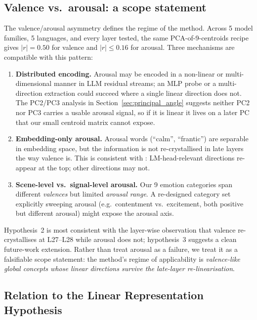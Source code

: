\subsection{Valence vs.\ arousal: a scope statement}

The valence/arousal asymmetry defines the regime of the method. Across 5
model families, 5 languages, and every layer tested, the same PCA-of-9-centroids
recipe gives $|r|=0.50$ for valence and $|r|\leq 0.16$ for arousal. Three
mechanisms are compatible with this pattern:

\begin{enumerate}[leftmargin=*]
\item \textbf{Distributed encoding.} Arousal may be encoded in a
non-linear or multi-dimensional manner in LLM residual streams; an
MLP probe or a multi-direction extraction could succeed where a single
linear direction does not. The PC2/PC3 analysis in
Section~\ref{sec:principal_angle} suggests neither PC2 nor PC3 carries
a usable arousal signal, so if it is linear it lives on a later PC
that our small centroid matrix cannot expose.
\item \textbf{Embedding-only arousal.} Arousal words (``calm'',
``frantic'') are separable in embedding space, but the information is
not re-crystallised in late layers the way valence is. This is
consistent with \cite{park2024linear}: LM-head-relevant directions
re-appear at the top; other directions may not.
\item \textbf{Scene-level vs.\ signal-level arousal.} Our 9 emotion
categories span different \emph{valences} but limited \emph{arousal
range}. A re-designed category set explicitly sweeping arousal
(e.g.\ contentment vs.\ excitement, both positive but different
arousal) might expose the arousal axis.
\end{enumerate}

Hypothesis~2 is most consistent with the layer-wise observation that
valence re-crystallises at L27--L28 while arousal does not; hypothesis~3
suggests a clean future-work extension. Rather than treat arousal as a
failure, we treat it as a falsifiable scope statement: the method's
regime of applicability is \emph{valence-like global concepts whose
linear directions survive the late-layer re-linearisation}.

\subsection{Relation to the Linear Representation Hypothesis}

